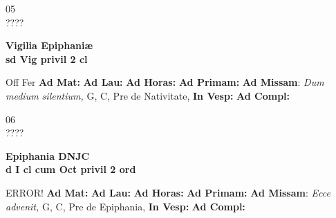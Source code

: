 \documentclass[10pt, openany]{book}
\begin{document}
    \begin{center}
        \begin{minipage}{3.5in}
            \vspace{2em}
            \begin{minipage}{0.5in}
                {\Huge 05} \\
                {\normalsize ????}
            \end{minipage}
            \begin{minipage}{3.0in}
                \textbf{ \large Vigilia Epiphaniæ \\
                \textnormal{\normalsize sd Vig privil 2 cl}}

            \end{minipage}
            \begin{justify}Off Fer
                \textbf{Ad Mat: }
                \textbf{Ad Lau: }
                \textbf{Ad Horas: }
                \textbf{Ad Primam: }\textbf{Ad Missam}: \textit{Dum medium silentium,} G, C, Pre de Nativitate, 
                \textbf{In Vesp: }
                \textbf{Ad Compl: }
            \end{justify}
        \end{minipage}
    \end{center}

    \begin{center}
        \begin{minipage}{3.5in}
            \vspace{2em}
            \begin{minipage}{0.5in}
                {\Huge 06} \\
                {\normalsize ????}
            \end{minipage}
            \begin{minipage}{3.0in}
                \textbf{ \large Epiphania DNJC \\
                \textnormal{\normalsize d I cl cum Oct privil 2 ord}}

            \end{minipage}
            \begin{justify}ERROR!
                \textbf{Ad Mat: }
                \textbf{Ad Lau: }
                \textbf{Ad Horas: }
                \textbf{Ad Primam: }\textbf{Ad Missam}: \textit{Ecce advenit,} G, C, Pre de Epiphania, 
                \textbf{In Vesp: }
                \textbf{Ad Compl: }
            \end{justify}
        \end{minipage}
    \end{center}
\end{document}
